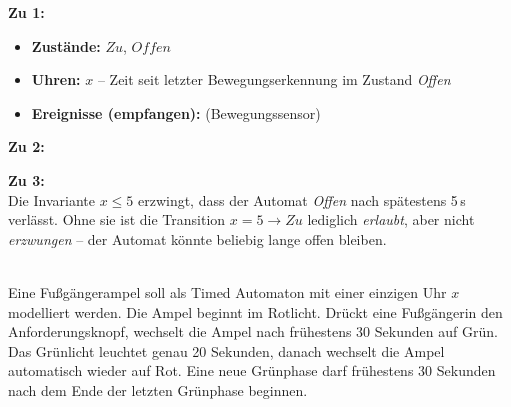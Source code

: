 \begin{loesung}
\textbf{Zu 1:}
\begin{itemize}
    \item \textbf{Zustände:} $\mathit{Zu}$, $\mathit{Offen}$
    \item \textbf{Uhren:} $x$ -- Zeit seit letzter Bewegungserkennung im Zustand \textit{Offen}
    \item \textbf{Ereignisse (empfangen):}  (Bewegungssensor)
\end{itemize}

\textbf{Zu 2:}

\begin{center}
\end{center}

\textbf{Zu 3:}\\
Die Invariante $x \leq 5$ erzwingt, dass der Automat \textit{Offen} nach spätestens 5\,s
verlässt. Ohne sie ist die Transition $x = 5 \to \mathit{Zu}$ lediglich \emph{erlaubt},
aber nicht \emph{erzwungen} -- der Automat könnte beliebig lange offen bleiben.
\end{loesung}

\umbruchlsg


\\
Eine Fußgängerampel soll als Timed Automaton mit einer einzigen Uhr $x$ modelliert werden.
Die Ampel beginnt im Rotlicht. Drückt eine Fußgängerin den Anforderungsknopf, wechselt die
Ampel nach frühestens 30 Sekunden auf Grün. Das Grünlicht leuchtet genau 20 Sekunden, danach
wechselt die Ampel automatisch wieder auf Rot. Eine neue Grünphase darf frühestens 30 Sekunden
nach dem Ende der letzten Grünphase beginnen.

